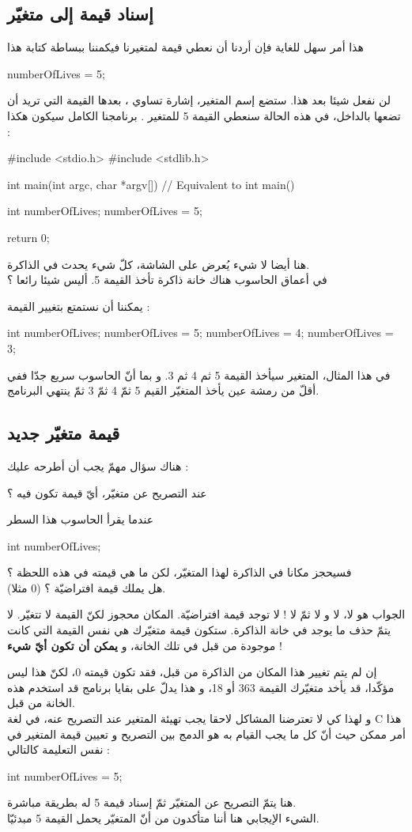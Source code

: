 \subsection{إسناد قيمة إلى متغيّر}
هذا أمر سهل للغاية فإن أردنا أن نعطي قيمة لمتغيرنا
فيكمننا ببساطة كتابة هذا
\begin{Csource}
numberOfLives = 5;
\end{Csource}
لن نفعل شيئا بعد هذا. ستضع إسم المتغير، إشارة تساوي ، بعدها القيمة التي تريد أن تضعها بالداخل، في هذه الحالة سنعطي القيمة 5 للمتغير
. برنامجنا الكامل سيكون هكذا :
\begin{Csource}
#include <stdio.h>
#include <stdlib.h>

int main(int argc, char *argv[]) // Equivalent to int main()
{
  int numberOfLives;
  numberOfLives = 5;

  return 0;
}
\end{Csource}
هنا أيضا لا شيء يُعرض على الشاشة، كلّ شيء يحدث في الذاكرة.\\
في أعماق الحاسوب هناك خانة ذاكرة تأخذ القيمة 5. أليس شيئا رائعا ؟

يمكننا أن نستمتع بتغيير القيمة :
\begin{Csource}
int numberOfLives;
numberOfLives = 5;
numberOfLives = 4;
numberOfLives = 3;
\end{Csource}
في هذا المثال، المتغير سيأخذ القيمة 5 ثم 4 ثم 3. و بما أنّ الحاسوب سريع جدّا ففي أقلّ من رمشة عين يأخذ المتغيّر القيم 5 ثمّ 4 ثمّ 3 ثمّ ينتهي البرنامج.

\subsection{قيمة متغيّر جديد}
هناك سؤال مهمّ يجب أن أطرحه عليك :
\begin{question}
  عند التصريح عن متغيّر، أيّ قيمة تكون فيه ؟
\end{question}
عندما يقرأ الحاسوب هذا السطر
\begin{Csource}
int numberOfLives;
\end{Csource}
فسيحجز مكانا في الذاكرة لهذا المتغيّر، لكن ما هي قيمته في هذه اللحظة ؟\\
هل يملك قيمة افتراضيّة ؟ (0 مثلا).

الجواب هو لا، لا و لا ثمّ لا ! لا توجد قيمة افتراضيّة. المكان محجوز لكنّ القيمة لا تتغيّر. لا يتمّ حذف ما يوجد في خانة الذاكرة. ستكون قيمة متغيّرك هي نفس القيمة التي كانت موجودة من قبل في تلك الخانة، و
\textbf{يمكن أن تكون أيّ شيء} !

إن لم يتم تغيير هذا المكان من الذاكرة من قبل، فقد تكون قيمته 0، لكنّ هذا ليس مؤكّدا، قد يأخد متغيّرك القيمة 363 أو 18، و هذا يدلّ على بقايا برنامج قد استخدم هذه الخانة من قبل.\\
و لهذا كي لا تعترضنا المشاكل لاحقا يجب تهيئة المتغير عند التصريح عنه، في لغة
\textenglish{C}
هذا أمر ممكن حيث أنّ كل ما يجب القيام به هو الدمج بين التصريح و تعيين قيمة المتغير في نفس التعليمة كالتالي :
\begin{Csource}
int numberOfLives = 5;
\end{Csource}
هنا يتمّ  التصريح عن المتغيّر ثمّ إسناد قيمة 5 له بطريقة مباشرة.\\
الشيء الإيجابي هنا أننا متأكدون من أنّ المتغيّر يحمل القيمة 5 مبدئيّا.

